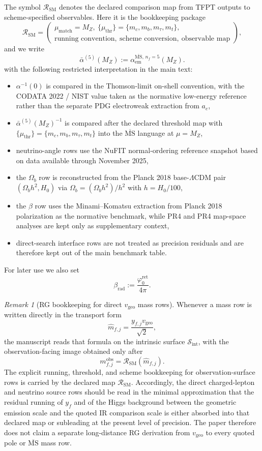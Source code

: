 \documentclass[11pt,a4paper]{article}
\theoremstyle{definition}
\theoremstyle{remark}
\newtheorem*{remark}{Remark}
\newcommand{\phiz}{\varphi_0^{\mathrm{ret}}}
\newcommand{\SM}{\mathrm{SM}}
\newcommand{\vgeo}{v_{\mathrm{geo}}}
\begin{document}
The symbol $\mathcal R_{\SM}$ denotes the declared comparison map from TFPT outputs to scheme-specified observables. Here it is the bookkeeping package
\[
\mathcal R_{\SM}
=
\left(
\begin{array}{l}
\mu_{\mathrm{match}}=M_Z,\ \{\mu_{\mathrm{thr}}\}=\{m_c,m_b,m_\tau,m_t\},\\
\text{running convention},\ \text{scheme conversion},\ \text{observable map}
\end{array}
\right),
\]
and we write
\[
\bar\alpha^{(5)}(M_Z):=\alpha_{\mathrm{em}}^{\overline{\mathrm{MS}},\,n_f=5}(M_Z).
\]
with the following restricted interpretation in the main text:
\begin{itemize}[leftmargin=1.5em, topsep=3pt, itemsep=2pt]
    \item $\alpha^{-1}(0)$ is compared in the Thomson-limit on-shell convention, with the CODATA 2022 / NIST value taken as the normative low-energy reference rather than the separate PDG electroweak extraction from $a_e$,
    \item $\bar\alpha^{(5)}(M_Z)^{-1}$ is compared after the declared threshold map with $\{\mu_{\mathrm{thr}}\}=\{m_c,m_b,m_\tau,m_t\}$ into the $\overline{\mathrm{MS}}$ language at $\mu=M_Z$,
    \item neutrino-angle rows use the NuFIT normal-ordering reference snapshot based on data available through November 2025,
    \item the $\Omega_b$ row is reconstructed from the Planck 2018 base-$\Lambda$CDM pair $(\Omega_b h^2,H_0)$ via $\Omega_b=(\Omega_b h^2)/h^2$ with $h=H_0/100$,
    \item the $\beta$ row uses the Minami--Komatsu extraction from Planck 2018 polarization as the normative benchmark, while PR4 and PR4 map-space analyses are kept only as supplementary context,
    \item direct-search interface rows are not treated as precision residuals and are therefore kept out of the main benchmark table.
\end{itemize}
For later use we also set
\[
\beta_{\mathrm{rad}}:=\frac{\phiz}{4\pi}.
\]

\begin{remark}[RG bookkeeping for direct \texorpdfstring{$\vgeo$}{vgeo} mass rows]
Whenever a mass row is written directly in the transport form
\[
\hat m_{f,j}=\frac{y_{f,j}\vgeo}{\sqrt2},
\]
the manuscript reads that formula on the intrinsic surface $\mathcal S_{\mathrm{int}}$, with the
observation-facing image obtained only after
\[
m_{f,j}^{\mathrm{obs}}=\mathcal R_{\SM}(\hat m_{f,j}).
\]
The explicit running, threshold, and scheme bookkeeping for observation-surface rows is carried by the declared map $\mathcal R_{\SM}$. Accordingly, the direct charged-lepton and neutrino source rows should be read in the minimal approximation that the residual running of $y_f$ and of the Higgs background between the geometric emission scale and the quoted IR comparison scale is either absorbed into that declared map or subleading at the present level of precision. The paper therefore does not claim a separate long-distance RG derivation from $\vgeo$ to every quoted pole or $\overline{\mathrm{MS}}$ mass row.
\end{remark}
\end{document}
